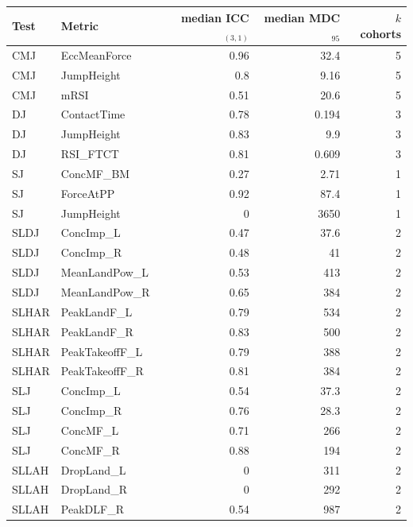 \begin{tabular}{llrrr}
\toprule
Test & Metric & median ICC$_{(3,1)}$ & median MDC$_{95}$ & $k$ cohorts \\
\midrule
CMJ & EccMeanForce & 0.96 & 32.4 & 5 \\
CMJ & JumpHeight & 0.8 & 9.16 & 5 \\
CMJ & mRSI & 0.51 & 20.6 & 5 \\
DJ & ContactTime & 0.78 & 0.194 & 3 \\
DJ & JumpHeight & 0.83 & 9.9 & 3 \\
DJ & RSI\_FTCT & 0.81 & 0.609 & 3 \\
SJ & ConcMF\_BM & 0.27 & 2.71 & 1 \\
SJ & ForceAtPP & 0.92 & 87.4 & 1 \\
SJ & JumpHeight & 0 & 3650 & 1 \\
SLDJ & ConcImp\_L & 0.47 & 37.6 & 2 \\
SLDJ & ConcImp\_R & 0.48 & 41 & 2 \\
SLDJ & MeanLandPow\_L & 0.53 & 413 & 2 \\
SLDJ & MeanLandPow\_R & 0.65 & 384 & 2 \\
SLHAR & PeakLandF\_L & 0.79 & 534 & 2 \\
SLHAR & PeakLandF\_R & 0.83 & 500 & 2 \\
SLHAR & PeakTakeoffF\_L & 0.79 & 388 & 2 \\
SLHAR & PeakTakeoffF\_R & 0.81 & 384 & 2 \\
SLJ & ConcImp\_L & 0.54 & 37.3 & 2 \\
SLJ & ConcImp\_R & 0.76 & 28.3 & 2 \\
SLJ & ConcMF\_L & 0.71 & 266 & 2 \\
SLJ & ConcMF\_R & 0.88 & 194 & 2 \\
SLLAH & DropLand\_L & 0 & 311 & 2 \\
SLLAH & DropLand\_R & 0 & 292 & 2 \\
SLLAH & PeakDLF\_R & 0.54 & 987 & 2 \\
\bottomrule
\end{tabular}
